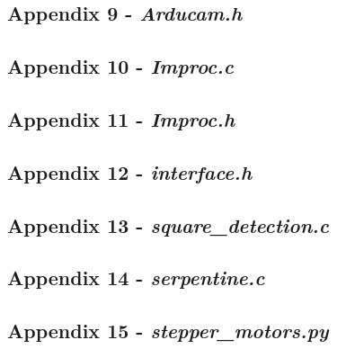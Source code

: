 

\newpage

\subsection{Appendix 9 - \textit{Arducam.h}}\label{A9}




\newpage
\subsection{Appendix 10 - \textit{Improc.c}}\label{A10}



\newpage

\subsection{Appendix 11 - \textit{Improc.h}}\label{A11}



\newpage

\subsection{Appendix 12 - \textit{interface.h}}\label{A12}



\newpage

\subsection{Appendix 13 - \textit{square\_detection.c}}\label{A13}



\newpage

\subsection{Appendix 14 - \textit{serpentine.c}}\label{A13}



\newpage

\subsection{Appendix 15 - \textit{stepper\_motors.py}}\label{A13}

